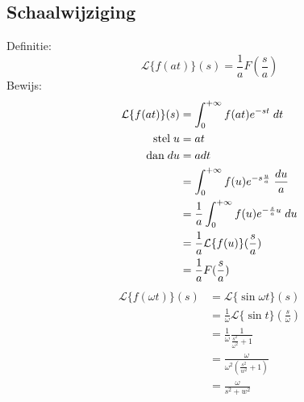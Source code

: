 \subsection{Schaalwijziging}
Definitie:
$$\mathcal{L}\{f(at)\}(s) = \frac{1}{a}F(\frac{s}{a})$$
Bewijs:
\begin{equation*}
 \begin{split}
  \mathcal{L}\{f(at)\}(s) & = \int_{0}^{+\infty}f(at)e^{-st}\;dt \\
                    \hbox{stel}\; u & = at \\
                    \hbox{dan}\; du & = adt \\
                          & =  \int_{0}^{+\infty}f(u)e^{-s\frac{u}{a}}\;\frac{du}{a} \\
                          & =  \frac{1}{a}\int_{0}^{+\infty}f(u)e^{-\frac{s}{a}u}\;du \\
                          & =  \frac{1}{a}\mathcal{L}\{f(u)\}(\frac{s}{a}) \\
                          & =  \frac{1}{a}F(\frac{s}{a})
 \end{split}
\end{equation*}
{
\begin{equation*}
 \begin{split}
  \mathcal{L}\{f(\omega t)\}(s) & = \mathcal{L}\{\sin \omega t\}(s) \\
                                & = \frac{1}{\omega}\mathcal{L}\{\sin t\}(\frac{s}{\omega}) \\
                                & = \frac{1}{\omega}\frac{1}{\frac{s^2}{\omega^2} + 1} \\
                                & = \frac{\omega}{\omega^2(\frac{s^2}{w^2} + 1)} \\
                                & = \frac{\omega}{s^2 + w^2}
 \end{split}
\end{equation*}}
